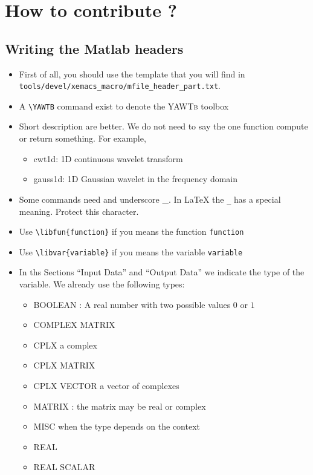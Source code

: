 \documentclass[12pt,a4paper]{article}
\newcommand{\YAWTB}{\textsc{YAWTb}}
\newcommand{\libfun}[1]{\texttt{#1}}  %
\newcommand{\libvar}[1]{\texttt{#1}}  %
\begin{document}
\section{How to contribute ?}
\label{sec:HowToCon}

\subsection{Writing the Matlab headers}
\label{sec:WriMatHea}


\begin{itemize}
\item First of all, you should use the template that you will find in\\
  \texttt{tools/devel/xemacs\_macro/mfile\_header\_part.txt}.
\item A \verb|\YAWTB| command exist to denote the \YAWTB{} toolbox
\item Short description are better.  We do not need to say the one function
  compute or return something.  For example,
  \begin{itemize}
  \item cwt1d: 1D continuous wavelet transform
  \item gauss1d: 1D Gaussian wavelet in the frequency domain
  \end{itemize}
\item Some commands need and underscore \_.  In \LaTeX{} the \verb|_| has a
  special meaning.  Protect this character.
\item Use \verb|\libfun{function}| if you means the function
  \libfun{function}
\item Use \verb|\libvar{variable}| if you means the variable \libvar{variable}
\item In ths Sections ``Input Data'' and ``Output Data'' we indicate the
  type of the variable.  We already use the following types:
  \begin{itemize}
  \item BOOLEAN : A real number with two possible values $0$ or $1$
  \item COMPLEX MATRIX
  \item CPLX a complex
  \item CPLX MATRIX
  \item CPLX VECTOR a vector of complexes
  \item MATRIX : the matrix may be real or complex
  \item MISC when the type depends on the context
  \item REAL
  \item REAL SCALAR

\end{itemize}
\end{itemize}
\end{document}
